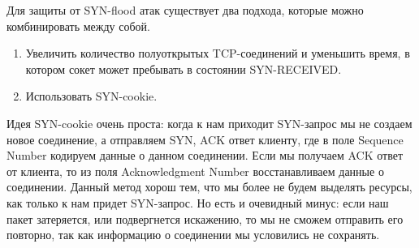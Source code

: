 \documentclass{bmstu}
\begin{document}
Для защиты от SYN-flood атак существует два подхода, которые можно комбинировать между собой.

\begin{enumerate}
    \item Увеличить количество полуоткрытых TCP-соединений и уменьшить время, в котором сокет может пребывать в состоянии SYN-RECEIVED.
    \item Использовать SYN-cookie.
\end{enumerate}

Идея SYN-cookie очень проста: когда к нам приходит SYN-запрос мы не создаем новое соединение, а отправляем SYN, ACK ответ клиенту, где в поле Sequence Number кодируем данные о данном соединении. Если мы получаем ACK ответ от клиента, то из поля Acknowledgment Number восстанавливаем данные о соединении. Данный метод хорош тем, что мы более не будем выделять ресурсы, как только к нам придет SYN-запрос. Но есть и очевидный минус: если наш пакет затеряется, или подвергнется искажению, то мы не сможем отправить его повторно, так как информацию о соединении мы условились не сохранять.





\end{document}
